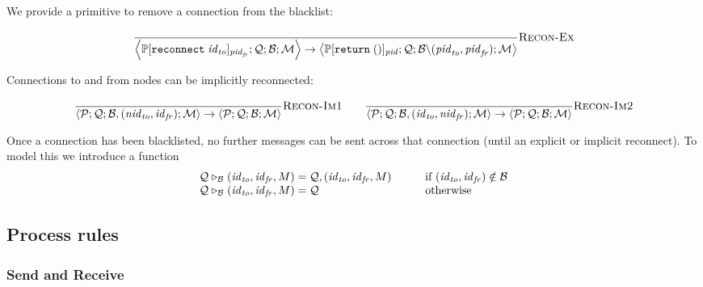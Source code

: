 \documentclass{article}
\newcommand{\sReturn}{\mathtt{return}}
\newcommand{\sReconnect}{\mathtt{reconnect}}
\newcommand{\sExtend}[1]{\mathrel{\triangleright_{#1}}}
\newcommand{\sNid}{\ensuremath{\mathit{nid}}}
\newcommand{\sPid}{\ensuremath{\mathit{pid}}}
\newcommand{\sId}{\ensuremath{\mathit{id}}}
\newcommand{\sSystem}[4]{\left\langle #1 ; #2 ; #3 ; #4 \right\rangle}
\newcommand{\sQueue}{\mathcal{Q}}
\newcommand{\sProcesses}{\mathcal{P}}
\newcommand{\sBlacklist}{\mathcal{B}}
\newcommand{\sMonitors}{\mathcal{M}}
\newcommand{\sCtxt}[1]{\mathbb{#1}}
\begin{document}
We provide a primitive to remove a connection from the blacklist:

\begin{equation*}
\frac{
}{
  \sSystem{\sCtxt{P}[ \sReconnect \; \sId_\mathit{to} ]_{\sPid_\mathit{fr}}}
          {\sQueue}
          {\sBlacklist}
          {\sMonitors}
\rightarrow
  \sSystem{\sCtxt{P}[ \sReturn \; () ]_\sPid}
          {\sQueue}
          {\sBlacklist \backslash (\sPid_\mathit{to}, \sPid_\mathit{fr})}
          {\sMonitors}
} \textsc{Recon-Ex}
\end{equation*}

Connections to and from nodes can be implicitly reconnected:

\begin{equation*}
\frac{
}{
  \sSystem{\sProcesses}{\sQueue}{\sBlacklist, (\sNid_\mathit{to}, \sId_\mathit{fr})}{\sMonitors}
\rightarrow
  \sSystem{\sProcesses}{\sQueue}{\sBlacklist}{\sMonitors}
} \textsc{Recon-Im1}
\qquad
\frac{
}{
  \sSystem{\sProcesses}{\sQueue}{\sBlacklist, (\sId_\mathit{to}, \sNid_\mathit{fr})}{\sMonitors}
\rightarrow
  \sSystem{\sProcesses}{\sQueue}{\sBlacklist}{\sMonitors}
} \textsc{Recon-Im2}
\end{equation*}

Once a connection has been blacklisted, no further messages can be sent across
that connection (until an explicit or implicit reconnect). To model this we
introduce a function
%
\begin{equation*}
\begin{array}{l@{\;=\;}l@{\hspace{3em}}l}
  \sQueue \sExtend{\sBlacklist} (\sId_\mathit{to}, \sId_\mathit{fr}, M) 
& 
  \sQueue,  (\sId_\mathit{to}, \sId_\mathit{fr}, M)
&
  \text{if } (\sId_\mathit{to}, \sId_\mathit{fr}) \notin \sBlacklist
\\
  \sQueue \sExtend{\sBlacklist} (\sId_\mathit{to}, \sId_\mathit{fr}, M) 
& 
  \sQueue
&
  \text{otherwise}
\end{array}
\end{equation*}



\subsection{Process rules}

\subsubsection{Send and Receive}
\end{document}
